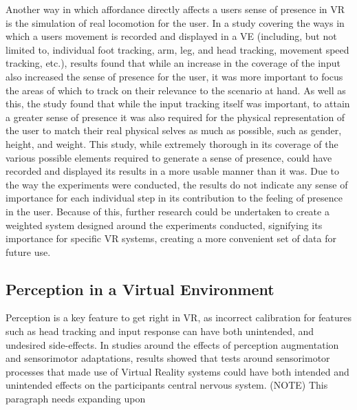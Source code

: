 \begin{multicols*}{2}
		Another way in which affordance directly affects a users sense of presence in VR is the simulation of real locomotion for the user. In a study \cite{Turchet2015} covering the ways in which a users movement is recorded and displayed in a VE (including, but not limited to, individual foot tracking, arm, leg, and head tracking, movement speed tracking, etc.), results found that while an increase in the coverage of the input also increased the sense of presence for the user, it was more important to focus the areas of which to track on their relevance to the scenario at hand. As well as this, the study found that while the input tracking itself was important, to attain a greater sense of presence it was also required for the physical representation of the user to match their real physical selves as much as possible, such as gender, height, and weight.
		This study, while extremely thorough in its coverage of the various possible elements required to generate a sense of presence, could have recorded and displayed its results in a more usable manner than it was. Due to the way the experiments were conducted, the results do not indicate any sense of importance for each individual step in its contribution to the feeling of presence in the user. Because of this, further research could be undertaken to create a weighted system designed around the experiments conducted, signifying its importance for specific VR systems, creating a more convenient set of data for future use.
		
	\subsection{Perception in a Virtual Environment}
	\label{lr:vr:perception}
		Perception is a key feature to get right in VR, as incorrect calibration for features such as head tracking and input response can have both unintended, and undesired side-effects. In studies \cite{Wright2006}  \cite{Wright2009} \cite{Wright2011} \cite{Wright2013} \cite{Wright2014} around the effects of perception augmentation and sensorimotor adaptations, results showed that tests around sensorimotor processes that made use of Virtual Reality systems could have both intended and unintended effects on the participants central nervous system. 
		(NOTE) This paragraph needs expanding upon
		

\end{multicols*}
